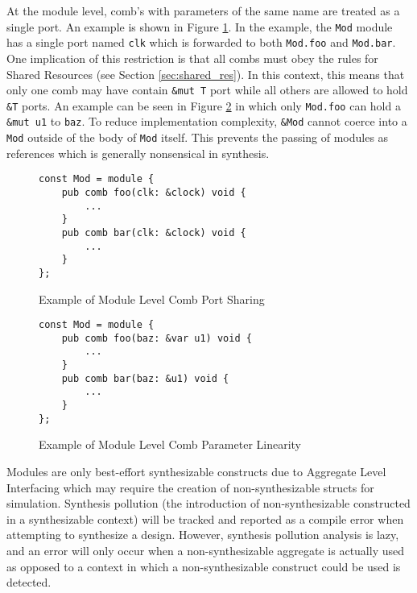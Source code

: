\documentclass[10pt]{article}
\begin{document}
At the module level, comb's with parameters of the same name are treated as a single port. An example
is shown in Figure \ref{fig:mod_comb_port_share}. In the example, the \verb|Mod| module has a single
port named \verb|clk| which is forwarded to both \verb|Mod.foo| and \verb|Mod.bar|. One implication
of this restriction is that all combs must obey the rules for Shared Resources (see Section
\ref{sec:shared_res}). In this context, this means that only one comb may have contain \verb|&mut T|
port while all others are allowed to hold \verb|&T| ports. An example can be seen in Figure
\ref{fig:mod_comb_port_linearity} in which only \verb|Mod.foo| can hold a \verb|&mut u1| to
\verb|baz|. To reduce implementation complexity, \verb|&Mod| cannot coerce into a \verb|Mod| outside
of the body of \verb|Mod| itself. This prevents the passing of modules as references which is
generally nonsensical in synthesis.

\begin{multicols}{2}
	\begin{figure}[H]
		\begin{verbatim}
const Mod = module {
    pub comb foo(clk: &clock) void {
        ...
    }
    pub comb bar(clk: &clock) void {
        ...
    }
};
    \end{verbatim}
		\vspace*{-10mm}
		\caption{Example of Module Level Comb Port Sharing}
		\label{fig:mod_comb_port_share}
	\end{figure}
	\columnbreak
	\begin{figure}[H]
		\begin{verbatim}
const Mod = module {
    pub comb foo(baz: &var u1) void {
        ...
    }
    pub comb bar(baz: &u1) void {
        ...
    }
};
    \end{verbatim}
		\vspace*{-10mm}
		\caption{Example of Module Level Comb Parameter Linearity}
		\label{fig:mod_comb_port_linearity}
	\end{figure}
\end{multicols}

\begin{mdframed}[frametitle=A Note on the Synthesizability of Modules]
	Modules are only best-effort synthesizable constructs due to Aggregate Level Interfacing which may
	require the creation of non-synthesizable structs for simulation. Synthesis pollution (the
	introduction of non-synthesizable constructed in a synthesizable context) will be tracked and
	reported as a compile error when attempting to synthesize a design. However, synthesis pollution
	analysis is lazy, and an error will only occur when a non-synthesizable aggregate is actually
	used as opposed to a context in which a non-synthesizable construct could be used is detected.
\end{mdframed}
\end{document}
